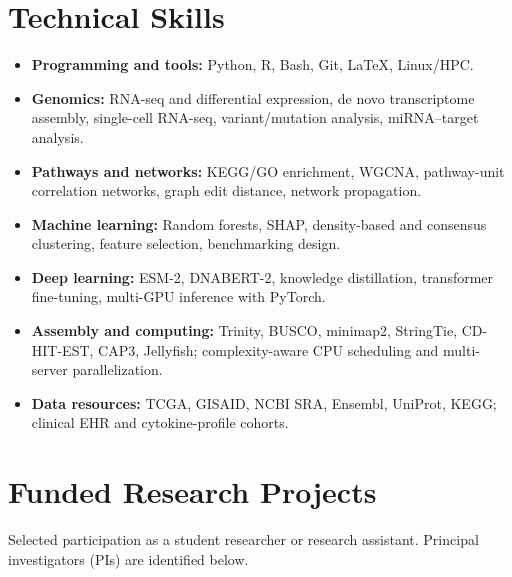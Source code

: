\documentclass[11pt,a4paper]{article}
\begin{document}
\section{Technical Skills}
\begin{itemize}
  \item \textbf{Programming and tools:} Python, R, Bash, Git, LaTeX, Linux/HPC.
  \item \textbf{Genomics:} RNA-seq and differential expression, de novo transcriptome
    assembly, single-cell RNA-seq, variant/mutation analysis, miRNA--target analysis.
  \item \textbf{Pathways and networks:} KEGG/GO enrichment, WGCNA, pathway-unit
    correlation networks, graph edit distance, network propagation.
  \item \textbf{Machine learning:} Random forests, SHAP, density-based and consensus
    clustering, feature selection, benchmarking design.
  \item \textbf{Deep learning:} ESM-2, DNABERT-2, knowledge distillation, transformer
    fine-tuning, multi-GPU inference with PyTorch.
  \item \textbf{Assembly and computing:} Trinity, BUSCO, minimap2, StringTie, CD-HIT-EST,
    CAP3, Jellyfish; complexity-aware CPU scheduling and multi-server parallelization.
  \item \textbf{Data resources:} TCGA, GISAID, NCBI SRA, Ensembl, UniProt, KEGG;
    clinical EHR and cytokine-profile cohorts.
\end{itemize}

\newpage
\section{Funded Research Projects}
Selected participation as a student researcher or research assistant.
Principal investigators (PIs) are identified below.
\end{document}

